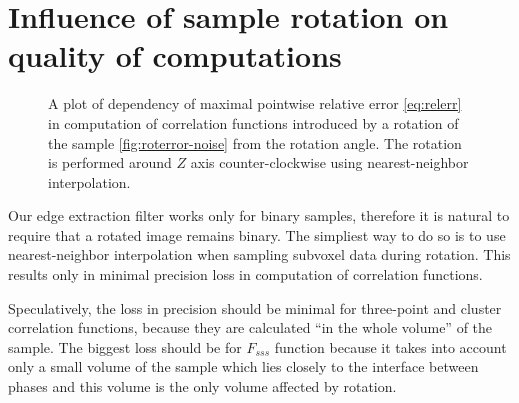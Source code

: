 \documentclass[reprint,amsmath,amssymb,aps,pre,showkeys,showpacs]{revtex4-1}
\begin{document}
\section{Influence of sample rotation on quality of computations}
\label{sec:rotqua}
\begin{figure}[tp]
  \centering
  \hfill
  \caption[]{A plot of dependency of maximal pointwise relative error
    \cref{eq:relerr} in computation of correlation functions introduced by a
    rotation of the sample \cref{fig:roterror-noise} from the rotation
    angle. The rotation is performed around $Z$ axis counter-clockwise using
    nearest-neighbor interpolation.}
  \label{fig:roterror}
\end{figure}
Our edge extraction filter works only for binary samples, therefore it is
natural to require that a rotated image remains binary. The simpliest way to do
so is to use nearest-neighbor interpolation when sampling subvoxel data during
rotation. This results only in minimal precision loss in computation of
correlation functions.

Speculatively, the loss in precision should be minimal for three-point and
cluster correlation functions, because they are calculated
``in the whole volume'' of the sample. The biggest loss should be for $F_{sss}$
function because it takes into account only a small volume of the sample which
lies closely to the interface between phases and this volume is the only volume
affected by rotation.
\end{document}
